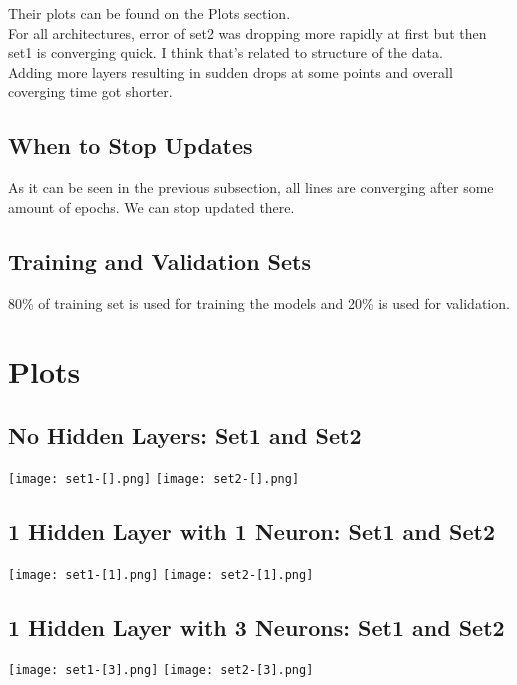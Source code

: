 \documentclass[conference]{IEEEtran}
\begin{document}
    Their plots can be found on the Plots section. \\
    For all architectures, error of set2 was dropping more rapidly at first but then set1 is converging quick. I think that's related to structure of the data.\\
    Adding more layers resulting in sudden drops at some points and overall coverging time got shorter.

    \subsection{When to Stop Updates}

    As it can be seen in the previous subsection, all lines are converging after some amount of epochs. We can stop updated there.


    \subsection{Training and Validation Sets}

    80\% of training set is used for training the models and 20\% is used for validation.


    \section{Plots}

    \subsection{No Hidden Layers: Set1 and Set2}

    \texttt{[image: set1-[].png]}
    \texttt{[image: set2-[].png]}


    \subsection{1 Hidden Layer with 1 Neuron: Set1 and Set2}

    \texttt{[image: set1-[1].png]}
    \texttt{[image: set2-[1].png]}


    \subsection{1 Hidden Layer with 3 Neurons: Set1 and Set2}

    \texttt{[image: set1-[3].png]}
    \texttt{[image: set2-[3].png]}
\end{document}

